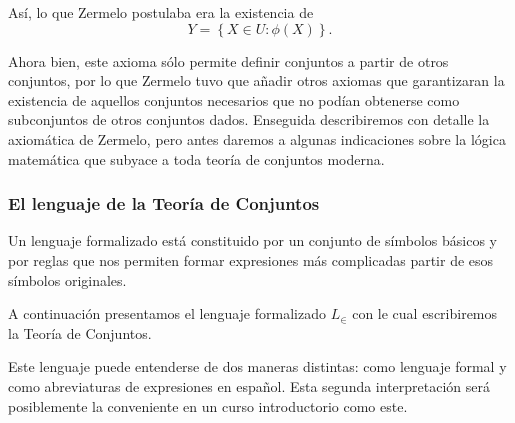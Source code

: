 Así, lo que Zermelo postulaba era la existencia de 
\[
Y=\left\{ X\in U:\phi\left(X\right)\right\} .
\]

Ahora bien, este axioma sólo permite definir conjuntos a partir de
otros conjuntos, por lo que Zermelo tuvo que añadir otros axiomas
que garantizaran la existencia de aquellos conjuntos necesarios que
no podían obtenerse como subconjuntos de otros conjuntos dados. Enseguida
describiremos con detalle la axiomática de Zermelo, pero antes daremos
a algunas indicaciones sobre la lógica matemática que subyace a toda
teoría de conjuntos moderna.

\subsubsection{El lenguaje de la Teoría de Conjuntos}

Un lenguaje formalizado está constituido por un conjunto de símbolos
básicos y por reglas que nos permiten formar expresiones más complicadas
partir de esos símbolos originales. 

A continuación presentamos el lenguaje formalizado $L_{\in}$ con
le cual escribiremos la Teoría de Conjuntos. 

Este lenguaje puede entenderse de dos maneras distintas: como lenguaje
formal y como abreviaturas de expresiones en español. Esta segunda
interpretación será posiblemente la conveniente en un curso introductorio
como este.

